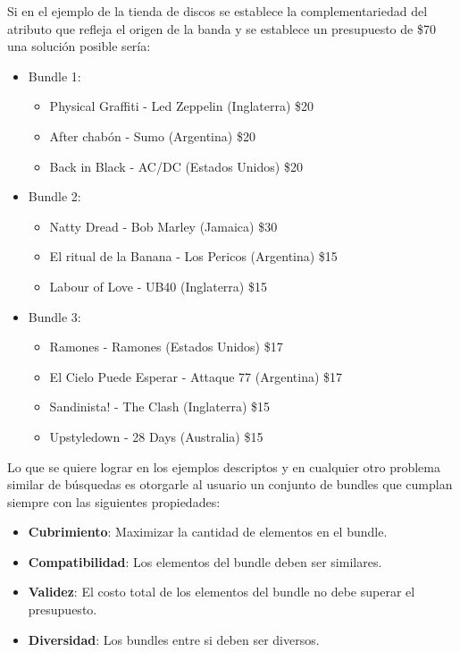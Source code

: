 Si en el ejemplo de la tienda de discos se establece la complementariedad del atributo que refleja el origen de la banda y se establece un presupuesto de \$70 una solución posible sería:
\begin{itemize}
  \item Bundle 1:
  \begin{itemize}
    \item Physical Graffiti - Led Zeppelin (Inglaterra) \$20
    \item After chabón - Sumo (Argentina) \$20
    \item Back in Black - AC/DC (Estados Unidos) \$20
  \end{itemize}
  \item Bundle 2:
  \begin{itemize}
    \item Natty Dread - Bob Marley (Jamaica) \$30
    \item El ritual de la Banana - Los Pericos (Argentina) \$15
    \item Labour of Love - UB40 (Inglaterra) \$15
  \end{itemize}
	  \item Bundle 3:
  \begin{itemize}
    \item Ramones - Ramones (Estados Unidos) \$17
    \item El Cielo Puede Esperar - Attaque 77 (Argentina) \$17
    \item Sandinista! - The Clash (Inglaterra) \$15
		\item Upstyledown - 28 Days (Australia) \$15
  \end{itemize}
\end{itemize}
Lo que se quiere lograr en los ejemplos descriptos y en cualquier otro problema similar de búsquedas es otorgarle al usuario un conjunto de bundles que cumplan siempre con las siguientes propiedades: 
\begin{itemize}
  \item \textbf{Cubrimiento}: Maximizar la cantidad de elementos en el bundle.
  \item \textbf{Compatibilidad}: Los elementos del bundle deben ser similares.
  \item \textbf{Validez}: El costo total de los elementos del bundle no debe superar el presupuesto.
  \item \textbf{Diversidad}: Los bundles entre si deben ser diversos.
\end{itemize}
